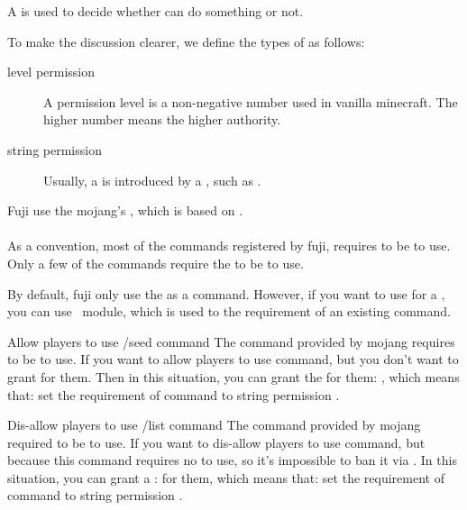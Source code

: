 \label{ch:permission}
A  is used to decide whether  can do something or not.


To make the discussion clearer, we define the types of  as follows:
\begin{description}
    \item [level permission] A permission level is a non-negative number used in vanilla minecraft.
    The higher number means the higher authority.
    \item[string permission] Usually, a  is introduced by a , such as .
\end{description}

\clearpage



Fuji use the mojang's , which is based on .\\
\\
As a convention, most of the commands registered by fuji, requires  to be  to use.
Only a few of the commands require the  to be  to use.

By default, fuji only use the  as  a command.
However, if you want to use  for a , you can use~ module, which is used to  the requirement of an existing command.

\begin{example}{Allow players to use /seed command}
    The command  provided by mojang requires  to be  to use.
    If you want to allow players to use  command, but you don't want to grant  for them.
    Then in this situation, you can grant the  for them: , which means that: set the requirement of command  to string permission .
\end{example}

\begin{example}{Dis-allow players to use /list command}
    The command  provided by mojang required  to be  to use.
    If you want to dis-allow players to use  command, but because this command requires no  to use, so it's impossible to ban it via .
    In this situation, you can grant a :  for them, which means that: set the requirement of command  to string permission .
\end{example}

